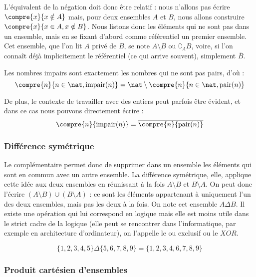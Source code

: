 L'équivalent de la négation doit donc être relatif : nous n'allons pas écrire $\compre{x}{x\notin A}$ mais, pour deux ensembles $A$ et $B$, nous allons construire $\compre{x}{x\in A, x\notin B}$. Nous listons donc les éléments qui ne sont pas dans un ensemble, mais en se fixant d'abord comme référentiel un premier ensemble. Cet ensemble, que l'on lit \og $A$ privé de $B$\fg{}, se note $A\setminus B$ ou $\complement_A B$, voire, si l'on connaît déjà implicitement le référentiel (ce qui arrive souvent), simplement $\overline B$.

\begin{expl}
    Les nombres impairs sont exactement les nombres qui ne sont pas pairs, d'où : $$\compre{n}{n\in\nat,\mathrm{impair}(n)}=\nat\setminus\compre{n}{n\in\nat,\mathrm{pair}(n)}$$
    
    De plus, le contexte de travailler avec des entiers peut parfois être évident, et dans ce cas nous pouvons directement écrire : $$\compre{n}{\mathrm{impair}(n)}=\overline{\compre{n}{\mathrm{pair}(n)}}$$
\end{expl}


\subsubsection{Différence symétrique}

Le complémentaire permet donc de supprimer dans un ensemble les éléments qui sont en commun avec un autre ensemble. La différence symétrique, elle, applique cette idée aux deux ensembles en réunissant à la fois $A\setminus B$ et $B\setminus A$. On peut donc l'écrire $(A\setminus B) \cup(B\setminus A)$ : ce sont les éléments appartenant à uniquement l'un des deux ensembles, mais pas les deux à la fois. On note cet ensemble $A\Delta B$. Il existe une opération qui lui correspond en logique mais elle est moins utile dans le strict cadre de la logique (elle peut se rencontrer dans l'informatique, par exemple en architecture d'ordinateur), on l'appelle le \og ou exclusif\fg{} ou le $XOR$.

\begin{expl}
    $$\{1,2,3,4,5\}\Delta \{5,6,7,8,9\}=\{1,2,3,4,6,7,8,9\}$$
\end{expl}


\subsubsection{Produit cartésien d'ensembles}

